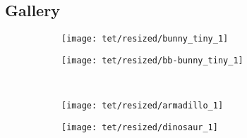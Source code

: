 \subsection{Gallery}

\begin{figure}[!htbp]
    \begin{center}
        \quad
        \begin{subfigure}[b]{0.45\textwidth}
            \centering
            \texttt{[image: tet/resized/bunny\_tiny\_1]}
        \end{subfigure}
        \begin{subfigure}[b]{0.45\textwidth}
            \centering
            \texttt{[image: tet/resized/bb-bunny\_tiny\_1]}
        \end{subfigure}\\ 

        \quad
        \begin{subfigure}[b]{0.45\textwidth}
            \centering
            \texttt{[image: tet/resized/armadillo\_1]}
        \end{subfigure}
        \begin{subfigure}[b]{0.45\textwidth}
            \centering
            \texttt{[image: tet/resized/dinosaur\_1]}
        \end{subfigure}\\ 

        
    \end{center}
\end{figure}